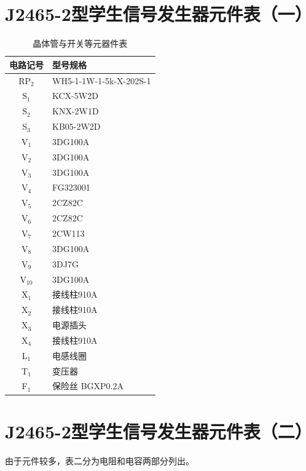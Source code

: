 \documentclass[12pt,UTF8]{ctexbook}
\begin{document}
	\appendix
	\section{J2465-2型学生信号发生器元件表（一）}
	\begin{table}[H]
		\centering
		\caption{晶体管与开关等元器件表}
		\begin{tabularx}{\textwidth}{|c|X|}
			\hline
			\textbf{电路记号} & \textbf{型号规格} \\ \hline
			RP\(_2\) & WH5-1-1W-1-5k-X-202S-1 \\ \hline
			S\(_1\) & KCX-5W2D \\ \hline
			S\(_2\) & KNX-2W1D \\ \hline
			S\(_3\) & KB05-2W2D \\ \hline
			V\(_1\) & 3DG100A \\ \hline
			V\(_2\) & 3DG100A \\ \hline
			V\(_3\) & 3DG100A \\ \hline
			V\(_4\) & FG323001 \\ \hline
			V\(_5\) & 2CZ82C \\ \hline
			V\(_6\) & 2CZ82C \\ \hline
			V\(_7\) & 2CW113 \\ \hline
			V\(_8\) & 3DG100A \\ \hline
			V\(_9\) & 3DJ7G \\ \hline
			V\(_{10}\) & 3DG100A \\ \hline
			X\(_1\) & 接线柱910A \\ \hline
			X\(_2\) & 接线柱910A \\ \hline
			X\(_3\) & 电源插头 \\ \hline
			X\(_4\) & 接线柱910A \\ \hline
			L\(_1\) & 电感线圈 \\ \hline
			T\(_1\) & 变压器 \\ \hline
			F\(_1\) & 保险丝 BGXP0.2A \\ \hline
		\end{tabularx}
	\end{table}
	
	\section{J2465-2型学生信号发生器元件表（二）}
	由于元件较多，表二分为电阻和电容两部分列出。
	
\end{document}
